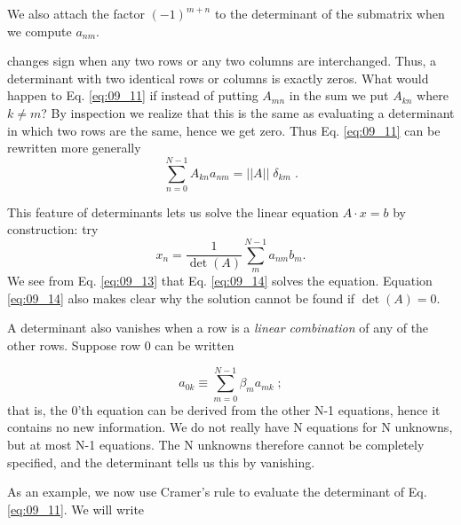 We also attach the factor $(-1)^{m+n}$ to the determinant of the
submatrix when we compute $a_{nm}$.

 changes sign when any two rows or any two 
columns are interchanged. Thus, a determinant with two identical rows or
columns is exactly zeros. What would happen to
Eq. \ref{eq:09_11} if instead of putting $A_{mn}$ in the sum we put $A_{kn}$ where
$k\neq m$? By inspection we realize that this is the same as evaluating
a determinant in which two rows are the same, hence we get zero.
Thus Eq. \ref{eq:09_11} can be rewritten more generally
\begin{equation}
    \sum_{n=0}^{N-1}A_{kn}a_{nm}=||A||\;\delta_{km}\;.\label{eq:09_13}
\end{equation}

This feature of determinants lets us solve the linear equation
$A \cdot x = b$ by construction: try
\begin{equation}
    x_n=\frac{1}{\det(A)}\sum_{m}^{N-1}a_{nm}b_m.\label{eq:09_14}
\end{equation}
We see from Eq. \ref{eq:09_13} that Eq. \ref{eq:09_14} solves the equation. Equation \ref{eq:09_14}
also makes clear why the solution cannot be found if $\det(A) = 0$.

A determinant also vanishes when a row is a \textit{linear combination}
of any of the other rows. Suppose row 0 can be written

\begin{equation*}
    a_{0k}\equiv    \sum_{m=0}^{N-1}\beta _m a_{mk}\;;
\end{equation*}
that is, the 0'th equation can be derived from the other N-1
equations, hence it contains no new information. We do not really
have N equations for N unknowns, but at most N-1 equations. The
N unknowns therefore cannot be completely specified, and the
determinant tells us this by vanishing.

As an example, we now use Cramer's rule to evaluate the determinant of Eq. \ref{eq:09_11}. We will write

